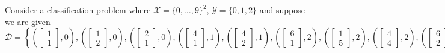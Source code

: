 \begin{example}
    Consider a classification problem where \( \mathcal{X} = \{0, \dots, 9\}^2 \), \( \mathcal{Y} = \{0,1,2\} \) and suppose we are given
    \[
    \mathcal{D} =
    \left\{
    \left( \begin{bmatrix} 1 \\ 1 \end{bmatrix}, 0 \right),
    \left( \begin{bmatrix} 1 \\ 2 \end{bmatrix}, 0 \right),
    \left( \begin{bmatrix} 2 \\ 1 \end{bmatrix}, 0 \right),
    \left( \begin{bmatrix} 4 \\ 1 \end{bmatrix}, 1 \right),
    \left( \begin{bmatrix} 4 \\ 2 \end{bmatrix}, 1 \right),
    \left( \begin{bmatrix} 6 \\ 1 \end{bmatrix}, 2 \right),
    \left( \begin{bmatrix} 1 \\ 5 \end{bmatrix}, 2 \right),
    \left( \begin{bmatrix} 4 \\ 4 \end{bmatrix}, 2 \right),
    \left( \begin{bmatrix} 6 \\ 2 \end{bmatrix}, 2 \right),
    \left( \begin{bmatrix} 2 \\ 4 \end{bmatrix}, 2 \right)
    \right\}.
    \]
\end{example}
\newpage

